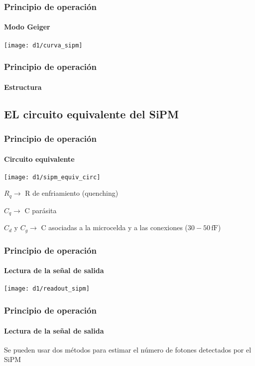 \documentclass{beamer}
\begin{document}
\begin{frame}
\frametitle{Principio de operación}
\framesubtitle{Modo Geiger}
\begin{center}
\texttt{[image: d1/curva\_sipm]}
\end{center}
\end{frame}

\begin{frame}
\frametitle{Principio de operación}
\framesubtitle{Estructura}
\begin{center}
\end{center}
\end{frame}

\subsection{EL circuito equivalente del SiPM}

\begin{frame}
\frametitle{Principio de operación}
\framesubtitle{Circuito equivalente}
\begin{center}
\texttt{[image: d1/sipm\_equiv\_circ]}
\end{center}

$R_q \rightarrow$ R de enfriamiento (quenching)

$C_q \rightarrow$ C parásita

$C_d\,\,\text{y}\,\,C_g \rightarrow$ C asociadas a la microcelda y a las
conexiones ($30-50\,\text{fF}$)
\end{frame}

\begin{frame}
\frametitle{Principio de operación}
\framesubtitle{Lectura de la señal de salida}
\texttt{[image: d1/readout\_sipm]}
\end{frame}

\begin{frame}
\frametitle{Principio de operación}
\framesubtitle{Lectura de la señal de salida}
Se pueden usar dos métodos para estimar el número de fotones detectados por el SiPM


\end{frame}
\end{document}
